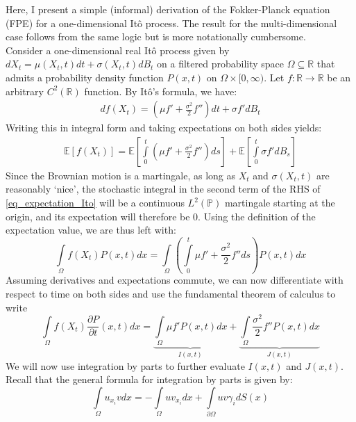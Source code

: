 Here, I present a simple (informal) derivation of the Fokker-Planck equation (FPE) for a one-dimensional It\^{o} process. The result for the multi-dimensional case follows from the same logic but is more notationally cumbersome.
\\
Consider a one-dimensional real It\^{o} process given by $dX_t = \mu(X_t,t)dt + \sigma(X_t,t)dB_t$ on a filtered probability space $\Omega \subseteq \mathbb{R}$ that admits a probability density function $P(x,t)$ on $\Omega \times [0,\infty)$. Let $f:\mathbb{R}\to\mathbb{R}$ be an arbitrary $C^2(\mathbb{R})$ function. By It\^{o}'s formula, we have:
\begin{align*}
    df(X_t) = \left(\mu f' + \frac{\sigma^2}{2}f''\right)dt + \sigma f' dB_t
\end{align*}
Writing this in integral form and taking expectations on both sides yields:
\begin{align}
\label{eq_expectation_Ito}
    \mathbb{E}[f(X_t)] = \mathbb{E}\left[\int\limits_{0}^{t}\left(\mu f' + \frac{\sigma^2}{2}f''\right)ds\right] + \mathbb{E}\left[\int\limits_{0}^{t}\sigma f' dB_s\right]
\end{align}
Since the Brownian motion is a martingale, as long as $X_t$ and $\sigma(X_t,t)$ are reasonably `nice', the stochastic integral in the second term of the RHS of \eqref{eq_expectation_Ito} will be a continuous $L^2(\mathbb{P})$ martingale starting at the origin, and its expectation will therefore be 0. Using the definition of the expectation value, we are thus left with:
\begin{equation*}
    \int\limits_{\Omega}f(X_t)P(x,t)dx = \int\limits_{\Omega}\left(\int\limits_{0}^{t}\mu f' + \frac{\sigma^2}{2}f''ds\right)P(x,t)dx
\end{equation*}
Assuming derivatives and expectations commute, we can now differentiate with respect to time on both sides and use the fundamental theorem of calculus to write
\begin{equation}
\label{eq_Ito_to_FPE_for_parts}
\int\limits_{\Omega}f(X_t)\frac{\partial P}{\partial t}(x,t)dx = \underbrace{\int\limits_{\Omega}\mu f'P(x,t)dx}_{I(x,t)} + \underbrace{\int\limits_{\Omega}\frac{\sigma^2}{2}f''P(x,t)dx}_{J(x,t)}
\end{equation}
We will now use integration by parts to further evaluate $I(x,t)$ and $J(x,t)$. Recall that the general formula for integration by parts is given by:
\begin{equation*}
    \int\limits_{\Omega}u_{x_i}vdx = -\int\limits_{\Omega}uv_{x_i}dx + \int\limits_{\partial\Omega}uv\gamma_{i}dS(x)
\end{equation*}

